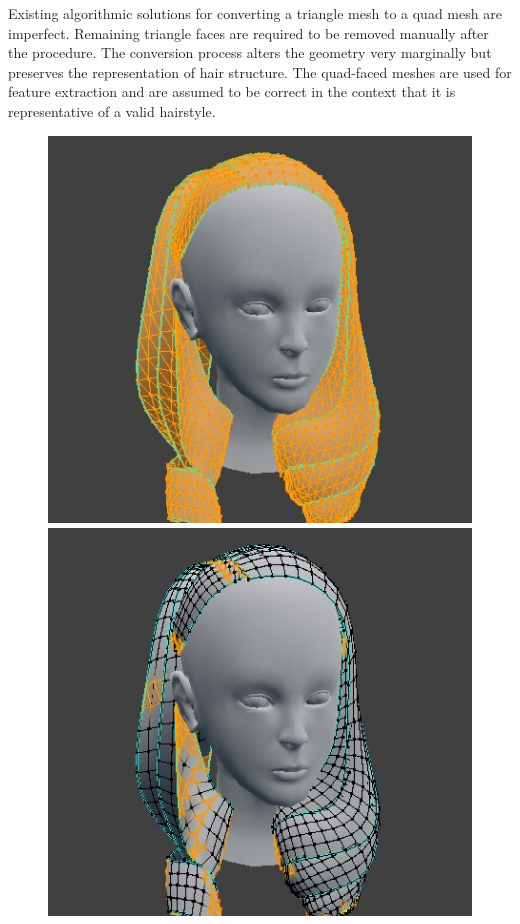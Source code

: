 \documentclass[ %
author={Dillon Keith Diep},
supervisor={Dr. Carl Henrik Ek},
degree={MEng},
title={ART-CG:},
subtitle={Assisted Real-time Content Generation of 3D Hair by Learning Manifolds},
type={Research},
year={2017} ]{dissertation}
\begin{document}
Existing algorithmic solutions for converting a triangle mesh to a quad mesh are imperfect. Remaining triangle faces are required to be removed manually after the procedure. The conversion process alters the geometry very marginally but preserves the representation of hair structure. The quad-faced meshes are used for feature extraction and are assumed to be correct in the context that it is representative of a valid hairstyle. 

\begin{figure}[!h]
	\centering
	\includegraphics[scale=2]{images/triToQuad1}
	\includegraphics[scale=2]{images/triToQuad2}

\end{figure}
\end{document}
